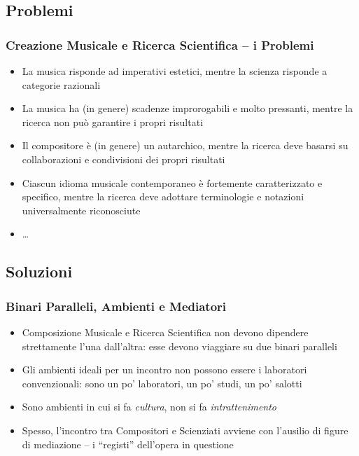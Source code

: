\subsection{Problemi}

\begin{frame}
    \frametitle<+- | alert@+->{Creazione Musicale e Ricerca Scientifica -- i Problemi}

    \begin{itemize}[<+- | alert@+->]
        \item La musica risponde ad imperativi estetici, mentre la scienza
            risponde a categorie razionali
        \item La musica ha (in genere) scadenze improrogabili e molto
            pressanti, mentre la ricerca non pu\`o garantire i propri
            risultati
        \item Il compositore \`e (in genere) un autarchico, mentre la ricerca
            deve basarsi su collaborazioni e condivisioni dei propri risultati
        \item Ciascun idioma musicale contemporaneo \`e fortemente
            caratterizzato e specifico, mentre la ricerca deve adottare
            terminologie e notazioni universalmente riconosciute
        \item \ldots
    \end{itemize}

\end{frame}

\subsection{Soluzioni}

\begin{frame}
    \frametitle<+- | alert@+->{Binari Paralleli, Ambienti e Mediatori}

    \begin{itemize}[<+- | alert@+->]
        \item Composizione Musicale e Ricerca Scientifica non devono dipendere
            strettamente l'una dall'altra: esse devono viaggiare su due binari
            paralleli
        \item Gli ambienti ideali per un incontro non possono essere i laboratori
            convenzionali: sono un po' laboratori, un po' studi, un po'
            salotti
        \item Sono ambienti in cui si fa \emph{cultura}, non si fa \emph{intrattenimento}
        \item Spesso, l'incontro tra Compositori e Scienziati avviene con
            l'ausilio di figure di mediazione -- i ``registi'' dell'opera in
            questione
    \end{itemize}
    
\end{frame}

